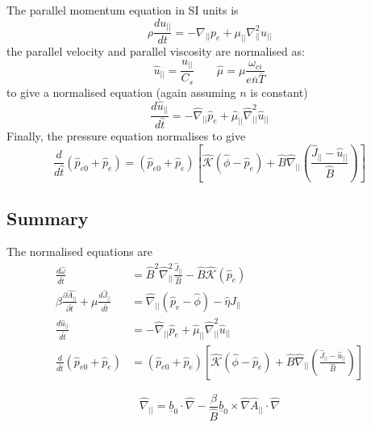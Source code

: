 \documentclass[12pt]{article}
\newcommand{\deriv}[2]{\ensuremath{\frac{\partial #1}{\partial #2}}}
\newcommand{\bvec}{\ensuremath{\underline{b}}}
\newcommand{\apar}{\ensuremath{A_{||}}}
\begin{document}
The parallel momentum equation in SI units is
\[
\rho\frac{du_{||}}{dt} = -\nabla_{||}p_e + \mu_{||}\nabla_{||}^2u_{||}
\]
the parallel velocity and parallel viscosity are normalised as:
\[
\boxed{\hat{u}_{||} = \frac{u_{||}}{C_s}} \qquad \boxed{\hat{\mu} = \mu\frac{\omega_{ci}}{e\overline{n}\overline{T}}}
\]
to give a normalised equation (again assuming $n$ is constant)
\[
\frac{d\hat{u}_{||}}{d\hat{t}} = -\hat{\nabla}_{||}\hat{p}_e + \hat{\mu}_{||}\hat{\nabla}_{||}^2\hat{u}_{||}
\]
Finally, the pressure equation normalises to give
\[
\frac{d}{d\hat{t}}\left(\hat{p}_{e0} + \hat{p}_e\right) = \left(\hat{p}_{e0} + \hat{p}_e\right)\left[ \hat{\mathcal{K}}\left(\hat{\phi} - \hat{p}_e\right) + \hat{B}\hat{\nabla}_{||}\left(\frac{\hat{J}_{||} - \hat{u}_{||}}{\hat{B}}\right)\right]
\]

\subsection{Summary}

The normalised equations are
\begin{align}
\frac{d\hat{\omega}}{d\hat{t}} &= \hat{B}^2\hat{\nabla}_{||}^2\frac{\hat{J}_{||}}{\hat{B}} - \hat{B}\hat{\mathcal{K}}\left(\hat{p}_e\right) \\
\beta\deriv{\hat{\apar}}{\hat{t}} + \mu\frac{d\hat{J}_{||}}{d\hat{t}} &= \hat{\nabla}_{||}\left(\hat{p}_e - \hat{\phi}\right) - \hat{\eta}\hat{J}_{||} \\
\frac{d\hat{u}_{||}}{d\hat{t}} &= -\hat{\nabla}_{||}\hat{p}_e + \hat{\mu}_{||}\hat{\nabla}_{||}^2\hat{u}_{||} \\
\frac{d}{d\hat{t}}\left(\hat{p}_{e0} + \hat{p}_e\right) &= \left(\hat{p}_{e0} + \hat{p}_e\right)\left[ \hat{\mathcal{K}}\left(\hat{\phi} - \hat{p}_e\right) + \hat{B}\hat{\nabla}_{||}\left(\frac{\hat{J}_{||} - \hat{u}_{||}}{\hat{B}}\right)\right]
\end{align}

\[
\hat{\nabla}_{||} = \bvec_0\cdot\hat{\nabla} - \frac{\beta}{\hat{B}}\bvec_0\times\hat{\nabla} \hat{A}_{||}\cdot\hat{\nabla}
\]
\end{document}
